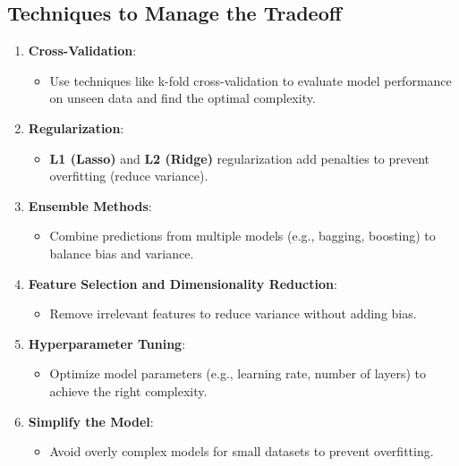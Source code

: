 \subsection*{Techniques to Manage the Tradeoff}
\begin{enumerate}
    \item \textbf{Cross-Validation}:
    \begin{itemize}
        \item Use techniques like k-fold cross-validation to evaluate model performance on unseen data and find the optimal complexity.
    \end{itemize}
    
    \item \textbf{Regularization}:
    \begin{itemize}
        \item \textbf{L1 (Lasso)} and \textbf{L2 (Ridge)} regularization add penalties to prevent overfitting (reduce variance).
    \end{itemize}

    \item \textbf{Ensemble Methods}:
    \begin{itemize}
        \item Combine predictions from multiple models (e.g., bagging, boosting) to balance bias and variance.
    \end{itemize}

    \item \textbf{Feature Selection and Dimensionality Reduction}:
    \begin{itemize}
        \item Remove irrelevant features to reduce variance without adding bias.
    \end{itemize}

    \item \textbf{Hyperparameter Tuning}:
    \begin{itemize}
        \item Optimize model parameters (e.g., learning rate, number of layers) to achieve the right complexity.
    \end{itemize}

    \item \textbf{Simplify the Model}:
    \begin{itemize}
        \item Avoid overly complex models for small datasets to prevent overfitting.
    \end{itemize}


\end{enumerate}
